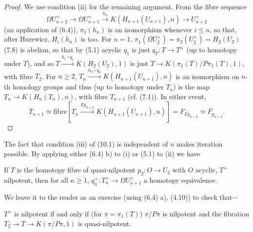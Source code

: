 \begin{proof}
We use condition (ii) for the remaining argument. From the fibre sequence 
$$\Omega U_{n+2}^+\longrightarrow \Omega U_{n+1}^+ \overset{h_n}{\longrightarrow} K(H_{n+1}(U_{n+1}),n) \longrightarrow U_{n+2}^+$$
(an application of (6.4)), $\pi_1(h_n)$ is an isomorphism whenever $i \leqslant n$, so that, after Hurewicz,
$H_i(h_n)$ is too. For $n = 1$, $\pi_1 (\Omega U_{2}^+) = \pi_2(U_{2}^+) = H_2(U_2)$ (7.8) is abelian, so that by (5.1) acyclic $q_1$ is just $q_T \colon   T \longrightarrow T^+$ (up to homotopy under $T$), and so $T \overset{h_1\circ q_1}{\longrightarrow} K(H_2(U_2), 1)$ is just $T \longrightarrow K(\pi_1(T)/P\pi_1(T), 1)$, with fibre $T_2$. For $n \geqslant 2$, $T_n\overset{h_n\circ q_n}{\longrightarrow} K(H_{n+1 }(U_{n+1} ),n)$ is an isomorphism
on $n$-th homology groups and thus (up to homotopy under $T_n$) is the map $T_n \longrightarrow K(H_n(T_n), n)$, with fibre $T_{n+1}$ (cf. (7.1)). In either event,
\[T_{n+1} \simeq \mbox{fibre} [T_n \overset{Fp_{n+2}}{\longrightarrow} K(H_{n+1}(U_{n+1}),n)]= F_{Fp_{n+2}} \simeq F_{p_{n+2}}.\]
\end{proof}
The fact that condition (iii) of (10.1) is independent of $n$ makes iteration possible. By applying either (6.4) b) to (i) or (5.1) to (ii) we have
\begin{theorem}
If $T$ is the homotopy fibre of quasi-nilpotent $p_2\colon   O\longrightarrow U_2$ with $O$ acyclic, $T^+$ nilpotent, then for all $n \geqslant 1$, $q_n^+\colon  T_n^+\longrightarrow \Omega U_{n+1}^+$ a homotopy equivalence.
\end{theorem}

We leave it to the reader as an exercise (using (6.4) a), (4.10)) to check that$\cdots $

\begin{prop}
  $T^+$ is nilpotent if and only if (for $\pi= \pi_1(T)$) $\pi/P\pi$ is nilpotent and the fibration $T_2 \longrightarrow  T \longrightarrow  K(\pi/P\pi, 1)$ is quasi-nilpotent.
 \end{prop} 

